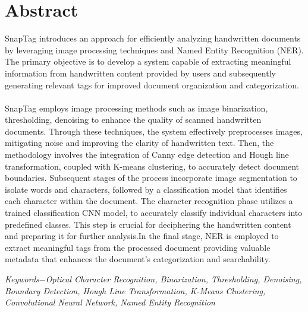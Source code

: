 \chapter*{Abstract}
SnapTag introduces an approach for efficiently analyzing handwritten documents by
leveraging image processing techniques and Named Entity Recognition (NER). The
primary objective is to develop a system capable of extracting meaningful information
from handwritten content provided by users and subsequently generating relevant tags for
improved document organization and categorization.\\\\
SnapTag employs image processing methods such as image binarization, thresholding,
denoising to enhance the quality of scanned handwritten documents. Through these
techniques, the system effectively preprocesses images, mitigating noise and improving
the clarity of handwritten text. Then, the methodology involves the integration of Canny
edge detection and Hough line transformation, coupled with K-means clustering, to
accurately detect document boundaries. Subsequent stages of the process incorporate
image segmentation to isolate words and characters, followed by a classification model
that identifies each character within the document. The character recognition phase utilizes a trained classification CNN model, to accurately
classify individual characters into predefined classes. This step is crucial for deciphering
the handwritten content and preparing it for further analysis.In the final stage, NER is
employed to extract meaningful tags from the processed document providing valuable
metadata that enhances the document's categorization and searchability.

{\textit{Keywords$-$Optical Character Recognition, Binarization, Thresholding, Denoising, Boundary Detection, Hough Line Transformation, K-Means Clustering, Convolutional Neural Network, Named Entity Recognition}} 


{

\KECadjusttocspacings %
\makeatletter
\def\@makeschapterhead#1{%
  {\newpage \parindent \z@ \raggedright
    \normalfont
    \interlinepenalty\@M
    \center\fontsize{16pt}{1} \bfseries \MakeUppercase{#1}\par\nobreak
    \vskip 18\p@ %
  }}
\makeatother 



\tableofcontents %
\listoffigures %
}

